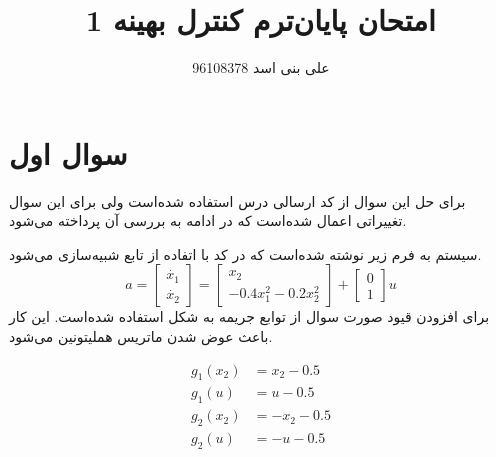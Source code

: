 \documentclass[12 pt]{article}
\title{امتحان پایان‌ترم کنترل بهینه 1}
\author{علی بنی اسد 96108378}
\begin{document}
	\maketitle
	\section*{سوال اول}
برای حل این سوال از کد ارسالی درس استفاده شده‌است ولی برای این سوال تغییراتی اعمال شده‌است که در ادامه به بررسی آن پرداخته می‌شود.


سیستم به فرم زیر نوشته شده‌‌است که در کد با اتفاده از تابع   شبیه‌سازی می‌شود.
$$
a = \begin{bmatrix}
	\dot{x_1}\\
	\dot{x_2}
\end{bmatrix} = \begin{bmatrix}
x_2\\
-0.4x_1^2 -0.2x_2^2
\end{bmatrix} + \begin{bmatrix}
0\\
1
\end{bmatrix}u
$$
برای افزودن قیود صورت سوال از توابع جریمه به شکل 
استفاده شده‌است. این کار باعث عوض شدن ماتریس هملیتونین می‌شود.

\begin{align*}
	g_1(x_2) &= x_2 - 0.5\\
	g_1(u) &= u - 0.5\\
	g_2(x_2) &= -x_2 - 0.5\\
	g_2(u) &= -u - 0.5\\
\end{align*}
\end{document}
